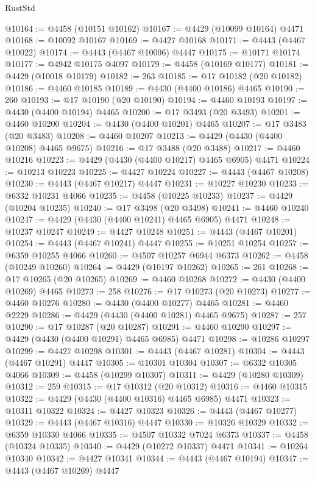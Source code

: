 \begin{lexlean}{RustStd}
\begin{coremodule}
{\begin{coremodule}
{{{{{{{{{{{{{{{{{{{{{{{{{{{{{{{{{{{{{{{{{{{{{{{{{{{{{{{{{{{{{{{{{{{{@10164 := @4458 (@10151 @10162)
@10167 := @4429 (@10099 @10164) @4471
@10168 := @10092 @10167
@10169 := @4427 @10168
@10171 := @4443 (@4467 @10022)
@10174 := @4443 (@4467 @10096) @4447
@10175 := @10171 @10174
@10177 := @4942 @10175 @4097
@10179 := @4458 (@10169 @10177)
@10181 := @4429 (@10018 @10179)
@10182 := 263
@10185 := @17 @10182 (@20 @10182)
@10186 := @4460 @10185
@10189 := @4430 (@4400 @10186) @4465
@10190 := 260
@10193 := @17 @10190 (@20 @10190)
@10194 := @4460 @10193
@10197 := @4430 (@4400 @10194) @4465
@10200 := @17 @3493 (@20 @3493)
@10201 := @4460 @10200
@10204 := @4430 (@4400 @10201) @4465
@10207 := @17 @3483 (@20 @3483)
@10208 := @4460 @10207
@10213 := @4429 (@4430 (@4400 @10208) @4465 @9675)
@10216 := @17 @3488 (@20 @3488)
@10217 := @4460 @10216
@10223 := @4429 (@4430 (@4400 @10217) @4465 @6905) @4471
@10224 := @10213 @10223
@10225 := @4427 @10224
@10227 := @4443 (@4467 @10208)
@10230 := @4443 (@4467 @10217) @4447
@10231 := @10227 @10230
@10233 := @6332 @10231 @4066
@10235 := @4458 (@10225 @10233)
@10237 := @4429 (@10204 @10235)
@10240 := @17 @3498 (@20 @3498)
@10241 := @4460 @10240
@10247 := @4429 (@4430 (@4400 @10241) @4465 @6905) @4471
@10248 := @10237 @10247
@10249 := @4427 @10248
@10251 := @4443 (@4467 @10201)
@10254 := @4443 (@4467 @10241) @4447
@10255 := @10251 @10254
@10257 := @6359 @10255 @4066
@10260 := @4507 @10257 @6944 @6373
@10262 := @4458 (@10249 @10260)
@10264 := @4429 (@10197 @10262)
@10265 := 261
@10268 := @17 @10265 (@20 @10265)
@10269 := @4460 @10268
@10272 := @4430 (@4400 @10269) @4465
@10273 := 258
@10276 := @17 @10273 (@20 @10273)
@10277 := @4460 @10276
@10280 := @4430 (@4400 @10277) @4465
@10281 := @4460 @2229
@10286 := @4429 (@4430 (@4400 @10281) @4465 @9675)
@10287 := 257
@10290 := @17 @10287 (@20 @10287)
@10291 := @4460 @10290
@10297 := @4429 (@4430 (@4400 @10291) @4465 @6985) @4471
@10298 := @10286 @10297
@10299 := @4427 @10298
@10301 := @4443 (@4467 @10281)
@10304 := @4443 (@4467 @10291) @4447
@10305 := @10301 @10304
@10307 := @6332 @10305 @4066
@10309 := @4458 (@10299 @10307)
@10311 := @4429 (@10280 @10309)
@10312 := 259
@10315 := @17 @10312 (@20 @10312)
@10316 := @4460 @10315
@10322 := @4429 (@4430 (@4400 @10316) @4465 @6985) @4471
@10323 := @10311 @10322
@10324 := @4427 @10323
@10326 := @4443 (@4467 @10277)
@10329 := @4443 (@4467 @10316) @4447
@10330 := @10326 @10329
@10332 := @6359 @10330 @4066
@10335 := @4507 @10332 @7024 @6373
@10337 := @4458 (@10324 @10335)
@10340 := @4429 (@10272 @10337) @4471
@10341 := @10264 @10340
@10342 := @4427 @10341
@10344 := @4443 (@4467 @10194)
@10347 := @4443 (@4467 @10269) @4447
}}}}}}}}}}}}}}}}}}}}}}}}}}}}}}}}}}}}}}}}}}}}}}}}}}}}}}}}}}}}}}}}}}}}
\end{coremodule}}
\end{coremodule}
\end{lexlean}
